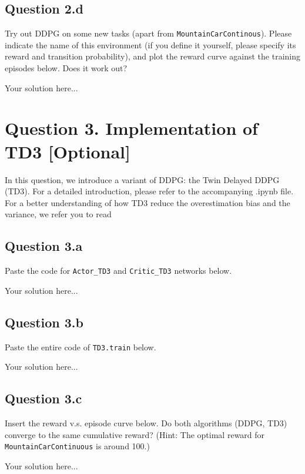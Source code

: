 \documentclass[12pt]{article}
\begin{document}
\subsection*{Question 2.d}
Try out DDPG  on some new tasks (apart from \texttt{MountainCarContinous}). Please indicate the name of this environment (if you define it yourself, please specify its reward and transition probability), and plot the reward curve against the training episodes below. Does it work out?
\begin{solution}
Your solution here...
\end{solution}

\section*{Question 3. Implementation of TD3 [Optional]}
In this question, we introduce a variant of DDPG: the Twin Delayed DDPG (TD3). For a detailed introduction, please refer to the accompanying .ipynb file. For a better understanding of how TD3 reduce the overestimation bias and the variance, we refer you to read \cite[Chapt.~4 and 5]{fujimoto2018addressing}
\subsection*{Question 3.a} 
Paste the code for \texttt{Actor\_TD3} and \texttt{Critic\_TD3} networks below.
\begin{solution}
Your solution here...
\end{solution}
\subsection*{Question 3.b} 
Paste the entire code of \texttt{TD3.train} below.
\begin{solution}
Your solution here...
\end{solution}
\subsection*{Question 3.c} 
Insert the reward v.s. episode curve below. Do both algorithms (DDPG, TD3) converge to the same cumulative reward? (Hint: The optimal reward for \texttt{MountainCarContinuous} is around 100.)
\begin{solution}
Your solution here...
\end{solution}
\end{document}
